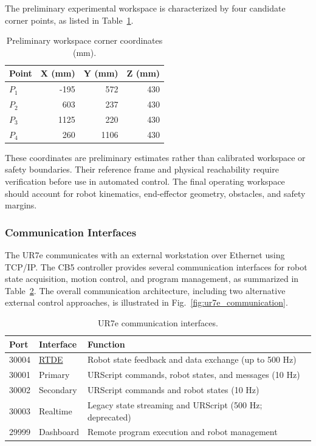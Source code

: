 \documentclass[11pt,a4paper]{article}
\begin{document}
The preliminary experimental workspace is characterized by four candidate corner points, as listed in Table~\ref{tab:ur7e_workspace}.

\begin{table}[htbp]
\centering
\caption{Preliminary workspace corner coordinates (mm).}
\label{tab:ur7e_workspace}
\begin{tabular}{lrrr}
\toprule
\textbf{Point} & \textbf{X (mm)} & \textbf{Y (mm)} & \textbf{Z (mm)} \\
\midrule
$P_1$ & -195 & 572 & 430 \\
$P_2$ & 603 & 237 & 430 \\
$P_3$ & 1125 & 220 & 430 \\
$P_4$ & 260 & 1106 & 430 \\
\bottomrule
\end{tabular}
\end{table}

These coordinates are preliminary estimates rather than calibrated workspace or safety boundaries. Their reference frame and physical reachability require verification before use in automated control. The final operating workspace should account for robot kinematics, end-effector geometry, obstacles, and safety margins.



\subsubsection{Communication Interfaces}
\label{sec:ur7e_communication}

The UR7e communicates with an external workstation over
Ethernet using TCP/IP. The CB5 controller provides several
communication interfaces for robot state acquisition, motion
control, and program management, as summarized in
Table~\ref{tab:ur7e_interfaces}. The overall communication
architecture, including two alternative external control
approaches, is illustrated in
Fig.~\ref{fig:ur7e_communication}.

\begin{table}[htbp]
\centering
\caption{UR7e communication interfaces.}
\label{tab:ur7e_interfaces}
\small
\renewcommand{\arraystretch}{1.1}
\begin{tabularx}{\linewidth}{@{}ll>{\raggedright\arraybackslash}X@{}}
\toprule
\textbf{Port} & \textbf{Interface} & \textbf{Function} \\
\midrule
30004 & \href{https://docs.universal-robots.com/tutorials/communication-protocol-tutorials/rtde-guide.html}{RTDE} &
Robot state feedback and data exchange (up to 500 Hz) \\
30001 & Primary &
URScript commands, robot states, and messages (10 Hz) \\
30002 & Secondary &
URScript commands and robot states (10 Hz) \\
30003 & Realtime &
Legacy state streaming and URScript (500 Hz; deprecated) \\
29999 & Dashboard &
Remote program execution and robot management \\
\bottomrule
\end{tabularx}
\end{table}
\end{document}
